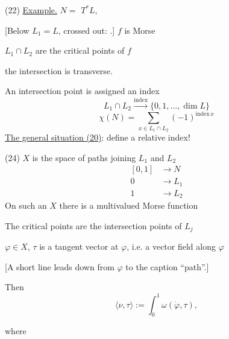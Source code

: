 (22) \underline{Example.} $N=$
$T^*L$,
\begin{center}
\end{center}
[Below $L_1=L$, crossed out:
.]
$f$ is Morse

$L_1\cap L_2$ are the critical points of $f$

the intersection is transverse.

An intersection point is assigned an index
\begin{equation*}
L_1\cap L_2\overset{\mathrm{index}}{\longrightarrow}
\{0,1,\ldots,\dim L\}
\end{equation*}
\begin{equation*}
\chi(N)=\sum_{x\in L_1\cap L_2}(-1)^{\mathrm{index}\,x}\tag{23}
\end{equation*}
\underline{The general situation (20)}: define a relative index!

(24) $X$ is the space of paths joining $L_1$ and $L_2$
\begin{equation*}
\begin{aligned}
[0,1]&\longrightarrow N\\
0&\longrightarrow L_1\\
1&\longrightarrow L_2
\end{aligned}
\end{equation*}
On such an $X$ there is a multivalued Morse function

The critical points are the intersection points of $L_j$

$\varphi\in X$, $\tau$ is a tangent vector at $\varphi$, i.e. a vector field along $\varphi$

[A short line leads down from $\varphi$ to the caption “path”.]

Then
\begin{equation*}
\langle \nu,\tau\rangle := \int_0^1 \omega(\dot{\varphi},\tau),
\tag{25}
\end{equation*}

where

